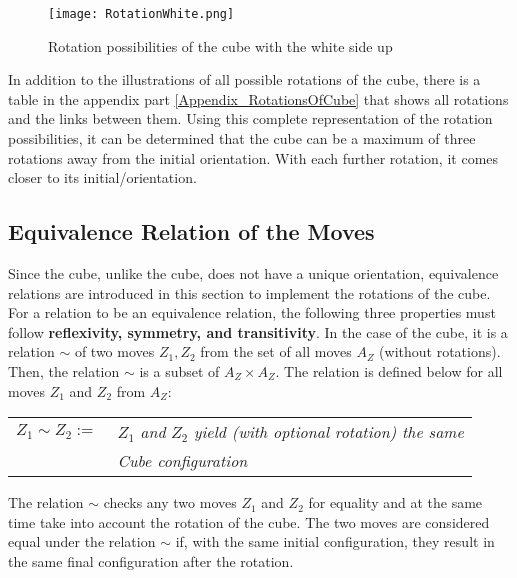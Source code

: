 \begin{figure}[H]
\centering
\texttt{[image: RotationWhite.png]}
\caption{Rotation possibilities of the cube with the white side up}
\label{ImageCubeRotationWhiteSide}
\end{figure}
In addition to the illustrations of all possible rotations of the cube, there is a table in the appendix part \ref{Appendix_RotationsOfCube} that shows all rotations and the links between them. Using this complete representation of the rotation possibilities, it can be determined that the cube can be a maximum of three rotations away from the initial orientation. With each further rotation, it comes closer to its initial/orientation.
\subsection{Equivalence Relation of the Moves}
\label{Section_EquivalenceRelationOfMoves}

Since the \Ttwo cube, unlike the \Tthree cube, does not have a unique orientation, equivalence relations are introduced in this section to implement the rotations of the cube.
For a relation to be an equivalence relation, the following three properties must follow \textbf{reflexivity, symmetry, and transitivity}. 
In the case of the \Ttwo cube, it is a relation $\sim$ of two moves $Z_1, Z_2$ from the set of all moves $A_Z$ (without rotations). Then, the relation $\sim$ is a subset of $A_Z \times A_Z$.
The relation is defined below for all moves $Z_1$ and $Z_2$ from $A_Z$:

\begin{center}
\begin{tabular}{l l}
$Z_1 \sim Z_2 := \ $ & $Z_1$ \textit{and} $Z_2$ \textit{yield (with optional rotation) the same }\\
\ & \textit{Cube configuration} \\
\end{tabular}
\end{center}

The relation $\sim$ checks any two moves $Z_1$ and $Z_2$ for equality and at the same time take into account the rotation of the cube. The two moves are considered equal under the relation $\sim$ if, with the same initial configuration, they result in the same final configuration after the rotation.

